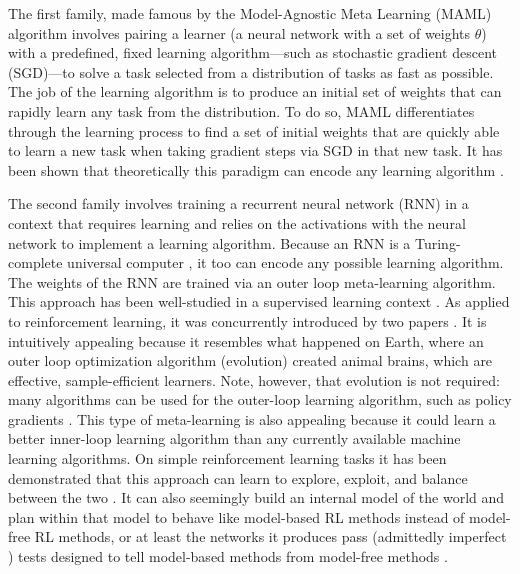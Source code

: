 \documentclass{article}
\begin{document}
The first family, made famous by the Model-Agnostic Meta Learning (MAML) algorithm \cite{finn2017model} involves pairing a learner (a neural network with a set of weights $\theta$) with a predefined, fixed learning algorithm---such as stochastic gradient descent (SGD)---to solve a task selected from a distribution of tasks as fast as possible. The job of the learning algorithm is to produce an initial set of weights that can rapidly learn any task from the distribution. To do so, MAML differentiates through the learning process to find a set of initial weights that are quickly able to learn a new task when taking gradient steps via SGD in that new task. It has been shown that theoretically this paradigm can encode any learning algorithm \cite{finn2017meta}. 

The second family involves training a recurrent neural network (RNN) in a context that requires learning and relies on the activations with the neural network to implement a learning algorithm. Because an RNN is a Turing-complete universal computer \cite{siegelmann1995computational}, it too can encode any possible learning algorithm. The weights of the RNN are trained via an outer loop meta-learning algorithm. This approach has been well-studied in a supervised learning context \cite{hochreiter2001learning,cotter1990fixed}.
As applied to reinforcement learning, it was concurrently introduced by two papers \cite{wang2016learning,duan2016rl}. It is intuitively appealing because it resembles what happened on Earth, where an outer loop optimization algorithm (evolution) created animal brains, which are effective, sample-efficient learners. Note, however, that evolution is not required: many algorithms can be used for the outer-loop learning algorithm, such as policy gradients \cite{wang2016learning,duan2016rl}. This type of meta-learning is also appealing because it could learn a better inner-loop learning algorithm than any currently available machine learning algorithms. On simple reinforcement learning tasks it has been demonstrated that this approach can learn to explore, exploit, and balance between the two \cite{wang2016learning, duan2016rl}. It can also seemingly build an internal model of the world and plan within that model to behave like model-based RL methods instead of model-free RL methods, or at least the networks it produces pass (admittedly imperfect \cite{akam2015simple}) tests designed to tell model-based methods from model-free methods \cite{wang2016learning}.
\end{document}
